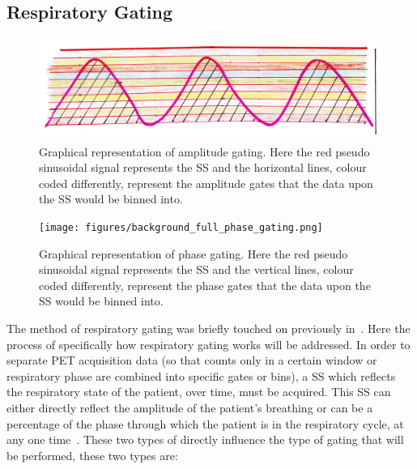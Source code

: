         \subsection{Respiratory Gating} \label{sec:respiratory_gating}
            
            \begin{figure}
                \centering
                    
                \includegraphics[width=1.0\linewidth]{figures/background_amplitude_gating.png}
                    
                \captionsetup{singlelinecheck=false, justification=raggedright}
                \caption{Graphical representation of amplitude gating. Here the red pseudo sinusoidal signal represents the \gls{SS} and the horizontal lines, colour coded differently, represent the amplitude gates that the data upon the \gls{SS} would be binned into.} \label{fig:respiratory_gating_ampliude_gating}
            \end{figure}
            
            \begin{figure}
                \centering
                    
                \texttt{[image: figures/background\_full\_phase\_gating.png]}
                    
                \captionsetup{singlelinecheck=false, justification=raggedright}
                \caption{Graphical representation of phase gating. Here the red pseudo sinusoidal signal represents the \gls{SS} and the vertical lines, colour coded differently, represent the phase gates that the data upon the \gls{SS} would be binned into.} \label{fig:respiratory_gating_full_phase_gating}
            \end{figure}
            
            The method of respiratory gating was briefly touched on previously in~. Here the process of specifically how respiratory gating works will be addressed. In order to separate \gls{PET} acquisition data (so that counts only in a certain window or respiratory phase are combined into specific gates or bins), a \gls{SS} which reflects the respiratory state of the patient, over time, must be acquired. This \gls{SS} can either directly reflect the amplitude of the patient's breathing or can be a percentage of the phase through which the patient is in the respiratory cycle, at any one time~\parencite{Kitamura2017TheMethods.}. These two types of  directly influence the type of gating that will be performed, these two types are:
            
